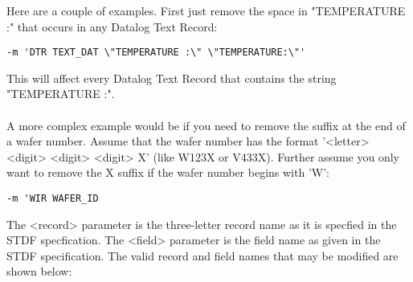 \documentclass[letterpaper]{article}
\begin{document}
Here are a couple of examples.  First just remove the space in "TEMPERATURE :"
that occurs in any Datalog Text Record:
\begin{verbatim}
-m 'DTR TEXT_DAT \"TEMPERATURE :\" \"TEMPERATURE:\"'
\end{verbatim}
This will affect every Datalog Text Record that contains the string "TEMPERATURE :".\\
\\
A more complex example would be if you need to remove the suffix at the end of
a wafer number.  Assume that the wafer number has the format '<letter> <digit> <digit> <digit> X'
(like W123X or V433X).  Further assume you only want to remove the X suffix if the 
wafer number begins with 'W':
\begin{verbatim}
-m 'WIR WAFER_ID 
\end{verbatim}
The <record> parameter is the three-letter record name as it is specfied
in the STDF specfication.  The <field> parameter is the field name as
given in the STDF specification.  The valid record and field names
that may be modified are shown below:
\end{document}
